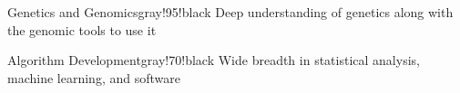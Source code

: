 \documentclass[letterpaper,11pt]{article}
\begin{document}
\begin{minipage}[top][3.25in][]{3in}
	\begin{mybox}{Genetics and Genomics}{}{gray!95!black}
		Deep understanding of genetics along with the genomic tools to use it
	\end{mybox}
	\begin{mybox}{Algorithm Development}{}{gray!70!black}
		Wide breadth in statistical analysis, machine learning, and software
	\end{mybox}
\end{minipage}
\end{document}
